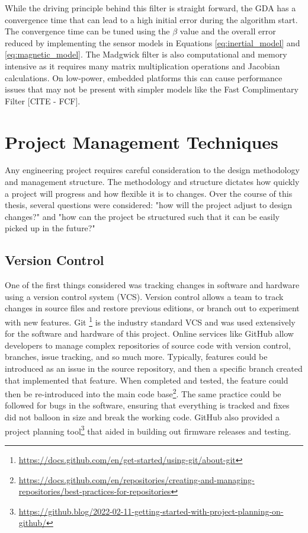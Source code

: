 While the driving principle behind this filter is straight forward, the GDA has a convergence time that can lead to a high initial error during the algorithm start.
The convergence time can be tuned using the $\beta$ value and the overall error reduced by implementing the sensor models in Equations \ref{eq:inertial_model} and \ref{eq:magnetic_model}.
The Madgwick filter is also computational and memory intensive as it requires many matrix multiplication operations and Jacobian calculations.
On low-power, embedded platforms this can cause performance issues that may not be present with simpler models like the Fast Complimentary Filter [CITE - FCF].

\section{Project Management Techniques} \label{sec:project_management}
Any engineering project requires careful consideration to the design methodology and management structure.
The methodology and structure dictates how quickly a project will progress and how flexible it is to changes.
Over the course of this thesis, several questions were considered: "how will the project adjust to design changes?" and "how can the project be structured such that it can be easily picked up in the future?"

\subsection{Version Control} \label{ssec:version_control}
One of the first things considered was tracking changes in software and hardware using a version control system (VCS).
Version control allows a team to track changes in source files and restore previous editions, or branch out to experiment with new features.
Git \footnote[5]{\url{https://docs.github.com/en/get-started/using-git/about-git}} is the industry standard VCS and was used extensively for the software and hardware of this project.
Online services like GitHub allow developers to manage complex repositories of source code with version control, branches, issue tracking, and so much more.
Typically, features could be introduced as an issue in the source repository, and then a specific branch created that implemented that feature.
When completed and tested, the feature could then be re-introduced into the main code base\footnote[6]{\url{https://docs.github.com/en/repositories/creating-and-managing-repositories/best-practices-for-repositories}}.
The same practice could be followed for bugs in the software, ensuring that everything is tracked and fixes did not balloon in size and break the working code.
GitHub also provided a project planning tool\footnote[7]{\url{https://github.blog/2022-02-11-getting-started-with-project-planning-on-github/}} that aided in building out firmware releases and testing.

